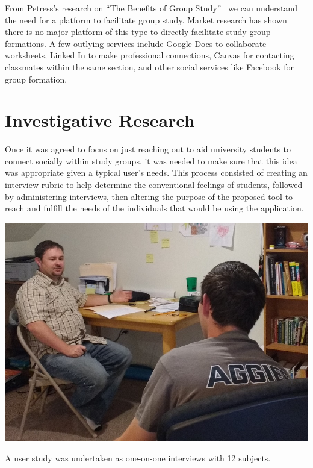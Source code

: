 \documentclass{sigchi-ext}
\begin{document}
From Petress's research on ``The Benefits of Group
Study''~\cite{petress2004benefits} we can understand the need for a platform
to facilitate group study. Market research has shown there is no major
platform of this type to directly facilitate study group formations. A few
outlying services include Google Docs to collaborate worksheets, Linked In to
make professional connections, Canvas for contacting classmates within the
same section, and other social services like Facebook for group formation.




\section{Investigative Research}


Once it was agreed to focus on just reaching out to aid university students
to connect socially within study groups, it was needed to make sure that
this idea was appropriate given a typical user's needs. This process
consisted of creating an interview rubric to help determine the
conventional feelings of students, followed by administering interviews,
then altering the purpose of the proposed tool to reach and fulfill the
needs of the individuals that would be using the application.

\begin{marginfigure}[0pc]
  \begin{minipage}{\marginparwidth}
    \centering
    \includegraphics[width=0.9\marginparwidth]{figures/user_study.jpg}
    \caption{A user study was undertaken as one-on-one interviews with 12 subjects.}~\label{fig:marginfig}
  \end{minipage}
\end{marginfigure}
\end{document}
